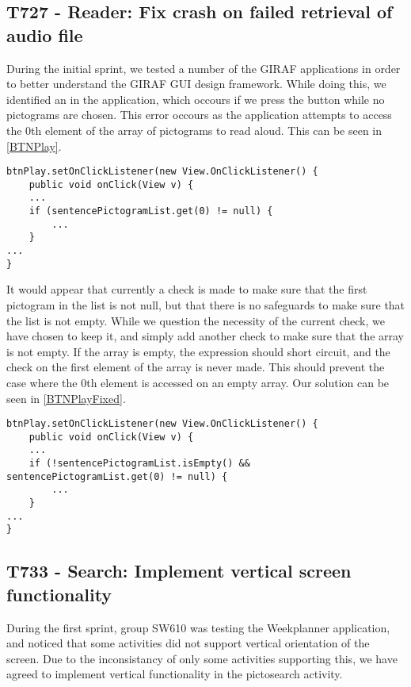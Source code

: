 \subsection{T727 - Reader: Fix crash on failed retrieval of audio file}
\label{T727}
During the initial sprint, we tested a number of the GIRAF
applications in order to better understand the GIRAF GUI design framework. While doing this, we
identified an  in the 
application, which occours if we press the  button while no
pictograms are chosen. This error occours as the application attempts to access
the 0th element of the array of pictograms to read aloud. This can be seen in
\autoref{BTNPlay}.\nl

\begin{minipage}[H]{\linewidth}
\begin{lstlisting}[caption = Accessing the 0th element of a null array., label = BTNPlay] 
btnPlay.setOnClickListener(new View.OnClickListener() {
	public void onClick(View v) {
	...
	if (sentencePictogramList.get(0) != null) {
		...
	}
...
}
\end{lstlisting}
\end{minipage}

It would appear that currently a check is made to make sure that the first
pictogram in the list is not null, but that there is no safeguards to make sure
that the list is not empty. While we question the necessity of the current
check, we have chosen to keep it, and simply add another check to make sure that
the array is not empty. If the array is empty, the expression should short
circuit, and the check on the first element of the array is never made. This
should prevent the case where the 0th element is accessed on an empty array. Our
solution can be seen in \autoref{BTNPlayFixed}.\nl

\begin{minipage}[H]{\linewidth}
\begin{lstlisting}[caption = Our solution to the presented problem., label = BTNPlayFixed] 
btnPlay.setOnClickListener(new View.OnClickListener() {
	public void onClick(View v) {
	...
	if (!sentencePictogramList.isEmpty() && sentencePictogramList.get(0) != null) {
		...
	}
...
}
\end{lstlisting}
\end{minipage}

\subsection{T733 - Search: Implement vertical screen functionality}
During the first sprint, group SW610 was testing the Weekplanner application,
and noticed that some activities did not support vertical orientation of the
screen. Due to the inconsistancy of only some activities supporting this, we
have agreed to implement vertical functionality in the pictosearch activity.\nl

